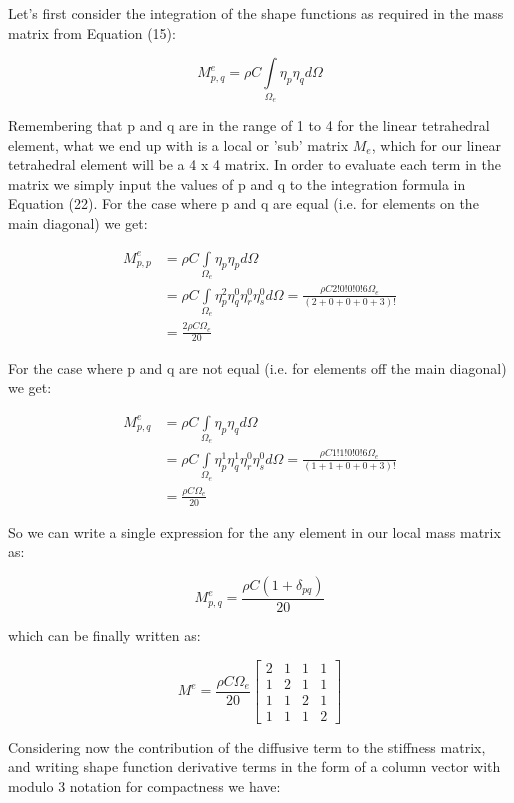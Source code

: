 \documentclass[12pt]{article}
\begin{document}
Let's first consider the integration of the shape functions as required in the mass matrix from Equation (15):

$$
M_{p,q}^e = \rho C \int\limits_{\Omega_e} \eta_p \eta_q d\Omega
$$

Remembering that p and q are in the range of 1 to 4 for the linear tetrahedral element,
what we end up with is a local or 'sub' matrix $M_e$, which for our linear tetrahedral
element will be a 4 x 4 matrix. In order to evaluate each term in the matrix we
simply input the values of p and q to the integration formula in Equation (22). For
the case where p and q are equal (i.e. for elements on the main diagonal) we get:

\begin{align*}
 M_{p,p}^e & = \rho C  \int\limits_{\Omega_e} \eta_p \eta_p d\Omega \\
              	& = \rho C \int\limits_{\Omega_e} \eta_p^2 \eta_q^0 \eta_r^0 \eta_s^0 d{\Omega}=
 \frac{\rho C 2!0!0!0!6\Omega_e}{(2+0+0+0+3)!} \\
 				& = \frac{2\rho C \Omega_e}{20}
\end{align*}

For the case where p and q are not equal (i.e. for elements off the main diagonal) we get:

\begin{align*}
 M_{p,q}^e & = \rho C \int\limits_{\Omega_e} \eta_p \eta_q d\Omega \\
              	& = \rho C \int\limits_{\Omega_e} \eta_p^1 \eta_q^1 \eta_r^0 \eta_s^0 d{\Omega}=
 \frac{\rho C 1!1!0!0!6\Omega_e}{(1+1+0+0+3)!} \\
 				& = \frac{\rho C \Omega_e}{20}
\end{align*}

So we can write a single expression for the any element in our local mass matrix as:

$$
M_{p,q}^e = \frac{\rho C (1+\delta_{pq})}{20}
$$

which can be finally written as:

\begin{equation}
M^e = \frac{\rho C \Omega_e}{20}{\begin{bmatrix} 2 & 1 & 1 & 1 \\ 1 & 2 & 1 & 1 \\ 1 & 1 & 2 & 1 \\ 1 & 1 & 1 & 2 \end{bmatrix}}
\end{equation}

Considering now the contribution of the diffusive term to the stiffness matrix, and writing shape function derivative terms in the form of a column vector with modulo 3 notation for compactness we have:
\end{document}
